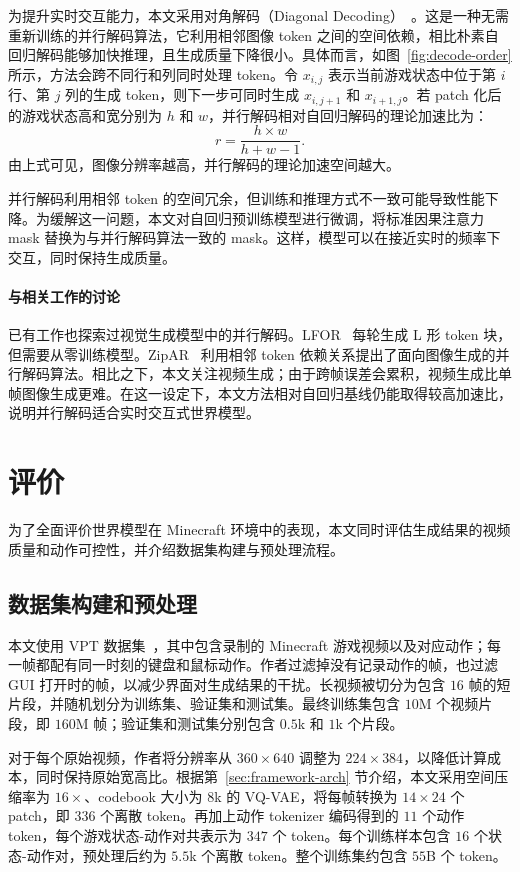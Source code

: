 \documentclass{article} %
\begin{document}
为提升实时交互能力，本文采用对角解码（Diagonal Decoding）~\citep{ye2025fast}。这是一种无需重新训练的并行解码算法，它利用相邻图像 token 之间的空间依赖，相比朴素自回归解码能够加快推理，且生成质量下降很小。具体而言，如图~\ref{fig:decode-order} 所示，方法会跨不同行和列同时处理 token。令 $x_{i,j}$ 表示当前游戏状态中位于第 $i$ 行、第 $j$ 列的生成 token，则下一步可同时生成 $x_{i,j+1}$ 和 $x_{i+1,j}$。若 patch 化后的游戏状态高和宽分别为 $h$ 和 $w$，并行解码相对自回归解码的理论加速比为：
\begin{equation}
  r = \frac{h \times w}{h+w-1}.
  \label{eq:accelerate ratio}
\end{equation}
由上式可见，图像分辨率越高，并行解码的理论加速空间越大。

并行解码利用相邻 token 的空间冗余，但训练和推理方式不一致可能导致性能下降。为缓解这一问题，本文对自回归预训练模型进行微调，将标准因果注意力 mask 替换为与并行解码算法一致的 mask。这样，模型可以在接近实时的频率下交互，同时保持生成质量。

\paragraph{与相关工作的讨论}
已有工作也探索过视觉生成模型中的并行解码。LFOR~\citep{li2023lformer} 每轮生成 L 形 token 块，但需要从零训练模型。ZipAR~\citep{he2024zipar} 利用相邻 token 依赖关系提出了面向图像生成的并行解码算法。相比之下，本文关注视频生成；由于跨帧误差会累积，视频生成比单帧图像生成更难。在这一设定下，本文方法相对自回归基线仍能取得较高加速比，说明并行解码适合实时交互式世界模型。

\section{评价}
\label{sec:eval}
为了全面评价世界模型在 Minecraft 环境中的表现，本文同时评估生成结果的视频质量和动作可控性，并介绍数据集构建与预处理流程。

\subsection{数据集构建和预处理}
本文使用 VPT 数据集~\citep{baker2022video}，其中包含录制的 Minecraft 游戏视频以及对应动作；每一帧都配有同一时刻的键盘和鼠标动作。作者过滤掉没有记录动作的帧，也过滤 GUI 打开时的帧，以减少界面对生成结果的干扰。长视频被切分为包含 $16$ 帧的短片段，并随机划分为训练集、验证集和测试集。最终训练集包含 $10$M 个视频片段，即 $160$M 帧；验证集和测试集分别包含 $0.5$k 和 $1$k 个片段。

对于每个原始视频，作者将分辨率从 $360\times 640$ 调整为 $224\times 384$，以降低计算成本，同时保持原始宽高比。根据第~\ref{sec:framework-arch} 节介绍，本文采用空间压缩率为 $16\times$、codebook 大小为 $8$k 的 VQ-VAE，将每帧转换为 $14\times 24$ 个 patch，即 $336$ 个离散 token。再加上动作 tokenizer 编码得到的 $11$ 个动作 token，每个游戏状态-动作对共表示为 $347$ 个 token。每个训练样本包含 $16$ 个状态-动作对，预处理后约为 $5.5$k 个离散 token。整个训练集约包含 $55$B 个 token。
\end{document}
